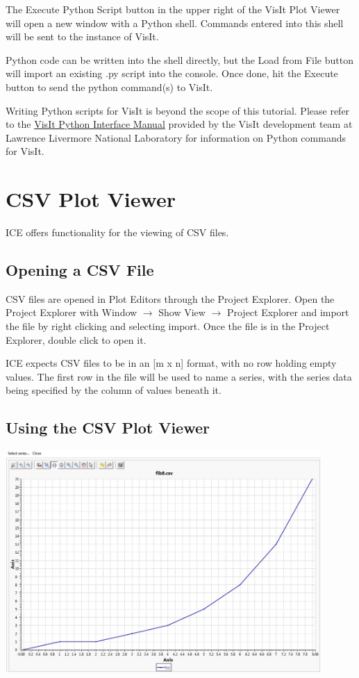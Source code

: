 \documentclass{article}
\begin{document}
The Execute Python Script button in the upper right of the VisIt Plot Viewer
will open a new window with a Python shell. Commands entered into this shell
will be sent to the instance of VisIt. 

Python code can be written into the shell directly, but the Load from File
button will import an existing .py script into the console. Once done, hit the
Execute button to send the python command(s) to VisIt.

Writing Python scripts for VisIt is beyond the scope of this tutorial. Please
refer to the
\href{https://wci.llnl.gov/simulation/computer-codes/visit/manuals}{VisIt Python
Interface Manual} provided by the VisIt development team at Lawrence Livermore
National Laboratory for information on Python commands for VisIt.

\section{CSV Plot Viewer}

ICE offers functionality for the viewing of CSV files. 

\subsection{Opening a CSV File}

CSV files are opened in Plot Editors through the Project Explorer. Open the
Project Explorer with Window $\rightarrow$ Show View $\rightarrow$ Project
Explorer and import the file by right clicking and selecting import. Once the
file is in the Project Explorer, double click to open it.

ICE expects CSV files to be in an [m x n] format, with no row holding empty
values. The first row in the file will be used to name a series, with the series
data being specified by the column of values beneath it.

\subsection{Using the CSV Plot Viewer}

\begin{center}
\includegraphics[width=12cm]{images/CSVPlotViewer}
\end{center}
\end{document}
